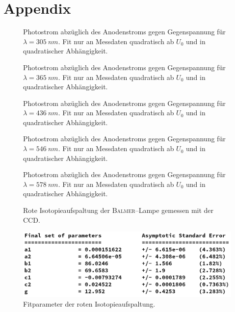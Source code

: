 \documentclass[sn-mathphys-num,iicol]{sn-jnl}
\theoremstyle{thmstyleone}
\theoremstyle{thmstyletwo}
\theoremstyle{thmstylethree}
\begin{document}
\section{Appendix}
\begin{figure}[h]
        \centering
        \resizebox{.5\textwidth}{!}{}
        \caption{Photostrom abzüglich des Anodenstroms gegen Gegenspannung für $\lambda =\SI{305}{n m}$. Fit nur an Messdaten quadratisch ab $U_0$ und in quadratischer Abhängigkeit.} \label{fig:photo_auswertung_305}
\end{figure}
\begin{figure}[h]
        \centering
        \resizebox{.5\textwidth}{!}{}
        \caption{Photostrom abzüglich des Anodenstroms gegen Gegenspannung für $\lambda =\SI{365}{n m}$. Fit nur an Messdaten quadratisch ab $U_0$ und in quadratischer Abhängigkeit.}
\end{figure}
\begin{figure}[h]
        \centering
        \resizebox{.5\textwidth}{!}{}
        \caption{Photostrom abzüglich des Anodenstroms gegen Gegenspannung für $\lambda =\SI{436}{n m}$. Fit nur an Messdaten quadratisch ab $U_0$ und in quadratischer Abhängigkeit.}
\end{figure}
\begin{figure}[h]
        \centering
        \resizebox{.5\textwidth}{!}{}
        \caption{Photostrom abzüglich des Anodenstroms gegen Gegenspannung für $\lambda =\SI{546}{n m}$. Fit nur an Messdaten quadratisch ab $U_0$ und in quadratischer Abhängigkeit.}
\end{figure}
\begin{figure}[h]
        \centering
        \resizebox{.5\textwidth}{!}{}
        \caption{Photostrom abzüglich des Anodenstroms gegen Gegenspannung für $\lambda =\SI{578}{n m}$. Fit nur an Messdaten quadratisch ab $U_0$ und in quadratischer Abhängigkeit.} \label{fig:photo_auswertung_578}
\end{figure}
\begin{figure}[h]
        \centering
        \resizebox{.5\textwidth}{!}{}
        \caption{Rote Isotopieaufspaltung der \textsc{Balmer}--Lampe gemessen mit der CCD.} \label{fig:ccdrot}
\end{figure}
\begin{figure}[h]
        \centering
        \includegraphics[width=.5\textwidth]{ccdrot_params.png}
        \caption{Fitparameter der roten Isotopieaufspaltung.}
\end{figure}
\end{document}
